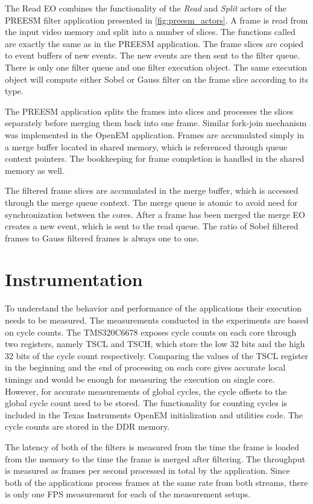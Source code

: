 The Read EO combines the functionality of the \textit{Read} and \textit{Split} actors of the PREESM filter application presented in \ref{fig:preesm_actors}. A frame is read from the input video memory and split into a number of slices. The functions called are exactly the same as in the PREESM application. The frame slices are copied to event buffers of new events. The new events are then sent to the filter queue. There is only one filter queue and one filter execution object. The same execution object will compute either Sobel or Gauss filter on the frame slice according to its type.

The PREESM application splits the frames into slices and processes the slices separately before merging them back into one frame. Similar fork-join mechanism was implemented in the OpenEM application. Frames are accumulated simply in a merge buffer located in shared memory, which is referenced through queue context pointers. The bookkeeping for frame completion is handled in the shared memory as well.

The filtered frame slices are accumulated in the merge buffer, which is accessed through the merge queue context. The merge queue is atomic to avoid need for synchronization between the cores. After a frame has been merged the merge EO creates a new event, which is sent to the read queue. The ratio of Sobel filtered frames to Gauss filtered frames is always one to one.

\section{Instrumentation}
\label{sec:instrumentation}
To understand the behavior and performance of the applications their execution needs to be measured. The measurements conducted in the experiments are based on cycle counts. The TMS320C6678 exposes cycle counts on each core through two registers, namely TSCL and TSCH, which store the low 32 bits and the high 32 bits of the cycle count respectively. Comparing the values of the TSCL register in the beginning and the end of processing on each core gives accurate local timings and would be enough for measuring the execution on single core. However, for accurate measurements of global cycles, the cycle offsets to the global cycle count need to be stored. The functionality for counting cycles is included in the Texas Instruments OpenEM initialization and utilities code. The cycle counts are stored in the DDR memory.

The latency of both of the filters is measured from the time the frame is loaded from the memory to the time the frame is merged after filtering. The throughput is measured as frames per second processed in total by the application. Since both of the applications process frames at the same rate from both streams, there is only one FPS measurement for each of the measurement setups.

